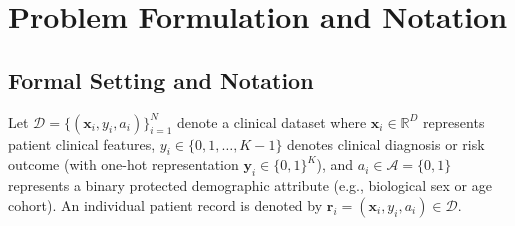 \documentclass[3p,12pt]{elsarticle}
\theoremstyle{plain}
\theoremstyle{definition}
\begin{document}
\section{Problem Formulation and Notation}
\label{sec:problem}

\subsection{Formal Setting and Notation}
Let $\mathcal{D} = \{(\mathbf{x}_i, y_i, a_i)\}_{i=1}^N$ denote a clinical dataset where $\mathbf{x}_i \in \mathbb{R}^D$ represents patient clinical features, $y_i \in \{0, 1, \dots, K-1\}$ denotes clinical diagnosis or risk outcome (with one-hot representation $\mathbf{y}_i \in \{0, 1\}^K$), and $a_i \in \mathcal{A} = \{0, 1\}$ represents a binary protected demographic attribute (e.g., biological sex or age cohort). An individual patient record is denoted by $\mathbf{r}_i = (\mathbf{x}_i, y_i, a_i) \in \mathcal{D}$. 
\end{document}

